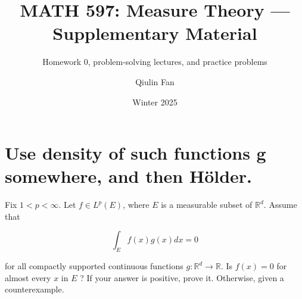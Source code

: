 \documentclass{qlnotes-export}
\title{MATH 597: Measure Theory --- Supplementary Material}
\subtitle{Homework 0, problem-solving lectures, and practice problems}
\author{Qiulin Fan}
\date{Winter 2025}
\begin{document}
\mainmatter
\chapter{Use density of such functions g somewhere, and then Hölder.}

Fix \(1 < p < \infty\). Let \(f \in L^{p}(E)\), where \(E\) is a measurable subset of \({\mathbb{R}}^{d}\). Assume that

\[\int_{E}f(x)g(x)dx = 0\]

for all compactly supported continuous functions \(g:{\mathbb{R}}^{d}\rightarrow{\mathbb{R}}\). Is \(f(x) = 0\) for almost every \(x\) in \(E\) ? If your answer is positive, prove it. Otherwise, given a counterexample.
\end{document}
